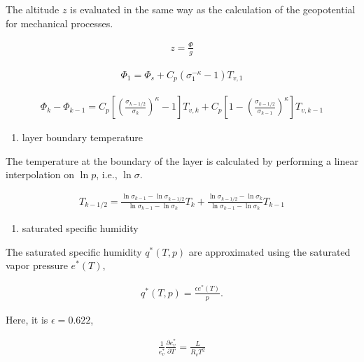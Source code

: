 The altitude \(z\) is evaluated in the same way as the calculation of
the geopotential for mechanical processes.

\begin{eqnarray}
  z = \frac{\Phi}{g}
\end{eqnarray}

\begin{eqnarray}
 \Phi_{1}  =  \Phi_{s} + C_{p} ( \sigma_{1}^{-\kappa} - 1  ) T_{v,1}
\end{eqnarray}

\begin{eqnarray}
 \Phi_k - \Phi_{k-1}
   =  C_{p}
   \left[ \left( \frac{ \sigma_{k-1/2} }{ \sigma_k } \right)^{\kappa}
          - 1 \right] T_{v,k}
       + C_{p}
   \left[ 1-
         \left( \frac{ \sigma_{k-1/2} }{ \sigma_{k-1} } \right)^{\kappa}
              \right] T_{v,k-1}
\end{eqnarray}

\begin{enumerate}
\def\labelenumi{\arabic{enumi}.}
\setcounter{enumi}{3}
\tightlist
\item
  layer boundary temperature
\end{enumerate}

The temperature at the boundary of the layer is calculated by performing
a linear interpolation on \(\ln p\), i.e., \(\ln \sigma\).

\begin{eqnarray}
  T_{k-1/2} = \frac{\ln \sigma_{k-1} - \ln \sigma_{k-1/2}}
                   {\ln \sigma_{k-1} - \ln \sigma_k      } T_k
            + \frac{\ln \sigma_{k-1/2} - \ln \sigma_k}
                   {\ln \sigma_{k-1} - \ln \sigma_k      } T_{k-1}
\end{eqnarray}

\begin{enumerate}
\def\labelenumi{\arabic{enumi}.}
\setcounter{enumi}{4}
\tightlist
\item
  saturated specific humidity
\end{enumerate}

The saturated specific humidity \(q^*(T,p)\) are approximated using the
saturated vapor pressure \(e^*(T)\),

\begin{eqnarray}
q^*(T,p) = \frac{\epsilon e^*(T)}{p} .
\end{eqnarray}

Here, it is \(\epsilon=0.622\),

\begin{eqnarray}
\frac{1}{e^*_v} \frac{\partial{e^*_v}}{\partial {T}} = \frac{L}{R_v T^2} \label{p199}
\end{eqnarray}

